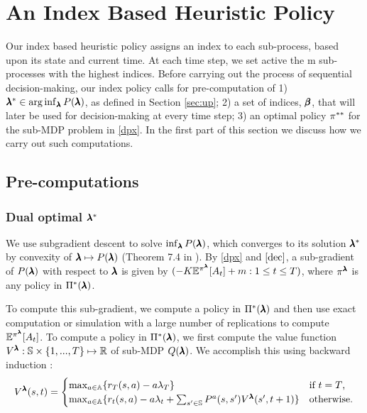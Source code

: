 \section{An Index Based Heuristic Policy}\label{sec:alg}
Our index based heuristic policy assigns an index to each sub-process, based upon its state and current time. At each time step, we set active the m sub-processes with the highest indices. Before carrying out the process of sequential decision-making, our index policy calls for pre-computation of 1) $\pmb{\lambda}^*\in \arg\inf_{\pmb{\lambda}}P(\pmb{\lambda})$, as defined in Section \ref{sec:up}; 2) a set of indices, $\pmb{\beta}$, that will later be used for decision-making at every time step; 3) an optimal policy $\pi^{**}$ for the sub-MDP problem in \eqref{dpx}. In the first part of this section we discuss how we carry out such computations. 
\subsection{Pre-computations}
\subsubsection{Dual optimal $\pmb{\lambda}^*$}\label{subsec:pi}
We use subgradient descent to solve $\inf_{\pmb{\lambda}} P(\pmb{\lambda})$, which converges to its solution $\pmb{\lambda}^*$ by convexity of $\pmb{\lambda} \mapsto P(\pmb{\lambda})$ (Theorem 7.4  in \citep{RusBook2006}).  By \eqref{dpx} and $\eqref{dec}$, a sub-gradient of $P(\pmb{\lambda})$ with respect to $\pmb{\lambda}$ is given by $(-K\mathbb{E}^{\pi^{\pmb{\lambda}}}[A_t]+m: 1\leq t\leq T)$, where $\pi^{\pmb{\lambda}}$ is any policy in $\Pi^*(\pmb{\lambda})$.

To compute this sub-gradient, we compute a policy in $\Pi^*(\pmb{\lambda})$ and then use exact computation or simulation with a large number of replications to compute $\mathbb{E}^{\pi^{\pmb{\lambda}}}[A_t]$.
To compute a policy in $\Pi^*(\pmb{\lambda})$, we first compute the value function $V^{\pmb{\lambda}}:\mathbb{S}\times\{1,...,T\}\mapsto \mathbb{R}$ of sub-MDP $Q(\pmb{\lambda})$.  We accomplish this using backward induction \citep{putermanBook}:
\begin{equation}
V^{\pmb{\lambda}}(s,t)=
\begin{cases}
	\max_{a\in \mathbb{A}}\{r_T(s,a)-a\lambda_T\}  & \text{if $t=T$,}\\
	\max_{a\in\mathbb{A}}\{r_t(s,a)-a\lambda_t+\sum_{s'\in\mathbb{S}}P^{a}(s,s')V^{\pmb{\lambda}}(s',t+1)\}  & \text{otherwise.}
\end{cases} 
\end{equation}

